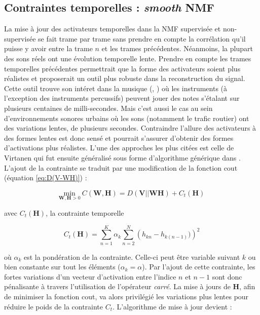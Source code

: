 \subsection{Contraintes temporelles : \textit{smooth} NMF}

La mise à jour des activateurs temporelles dans la NMF supervisée et non-supervisée se fait trame par trame sans prendre en compte la corrélation qu'il puisse y avoir entre la trame $n$ et les trames précédentes. Néanmoins, la plupart des sons réels ont une évolution temporelle lente. Prendre en compte les trames temporelles précédentes permettrait que la forme des activateurs soient plus réalistes et proposerait un outil plus robuste dans la reconstruction du signal. Cette outil trouve son intéret dans la musique (\cite{virtanen_sound_2003}, \cite{fevotte_majorization-minimization_2011}) où les instruments (à l'exception des instruments percussifs) peuvent jouer des notes s'étalant sur plusieurs centaines de milli-secondes. Mais c'est aussi le cas au sein d'environnements sonores urbains où les sons (notamment le trafic routier) ont des variations lentes, de plusieurs secondes. Contraindre l'allure des activateurs à des formes lentes est donc sensé et pourrait s'assurer d'obtenir des formes d'activations plus réalistes. L'une des approches les plus citées est celle de Virtanen \cite{virtanen_monaural_2007} qui fut ensuite généralisé sous forme d'algorithme générique dans \cite{fevotte2017single}.  L'ajout de la contrainte se traduit par une modification de la fonction cout (équation \ref{eq:D(V-WH)}) : 

\begin{equation}\label{eq:CostSmoothEssid}
\underset{\mathbf{W}, \mathbf{H} > 0}{\text{min}}~ C(\mathbf{W},\mathbf{H}) = D(\mathbf{V}\vert\vert \mathbf{WH}) + C_t(\mathbf{H})
\end{equation}

avec $C_t(\mathbf{H})$, la contrainte temporelle
 
\begin{equation}
C_t(\mathbf{H}) = \sum_{n=1}^K \alpha_k\sum_{n=2}^N \left(h_{kn} - h_{k(n-1)})\right)^2
\end{equation}

où $\alpha_k$ est la pondération de la contrainte. Celle-ci peut être variable suivant $k$ ou bien constante sur tout les éléments ($\alpha_k = \alpha$). Par l'ajout de cette contrainte, les fortes variations d'un vecteur d'activation entre l'indice $n$ et $n-1$ sont donc pénalisante à travers l'utilisation de l'opérateur \textit{carré}. La mise à jours de $\mathbf{H}$, afin de minimiser la fonction cout, va alors privilégié les variations plus lentes pour réduire le poids de la contrainte $C_t$. L'algorithme de mise à jour devient :


